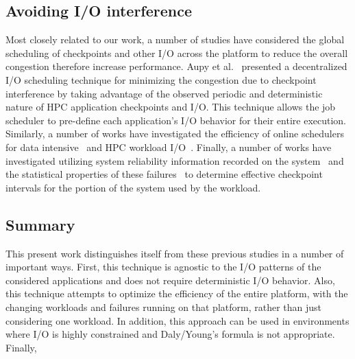  \subsection{Avoiding I/O interference}

Most closely related to our work, a number of studies have considered the
global scheduling of checkpoints and other I/O across the platform to reduce
the overall congestion therefore increase performance.  Aupy et
al.~\cite{Aupy:2017:Periodic} presented a decentralized I/O scheduling
technique for minimizing the congestion due to checkpoint interference by
taking advantage of the observed periodic and deterministic nature of HPC
application checkpoints and I/O.  This technique allows the job scheduler to
pre-define each application’s I/O behavior for their entire execution.
Similarly, a number of works have investigated the efficiency of online
schedulers for data intensive~\cite{Groot2013,Sim:2015:AnalyzeThis} and HPC
workload
I/O~\cite{Dorier2014,Gainaru:2015:Scheduling,Zhou:2015:IOAware,Herbein2016}.
Finally, a number of works have investigated utilizing system reliability
information recorded on the system~\cite{Oliner:2006:Cooperative} and the
statistical properties of these failures~\cite{Tiwari:2014:Lazy} to determine
effective checkpoint intervals for the portion of the system used by the
workload.

\subsection{Summary}

This present work distinguishes itself from these previous studies in a number
of important ways.  First, this technique is agnostic to the I/O patterns of
the considered applications and does not require deterministic I/O behavior.
Also, this technique attempts to optimize the efficiency of the entire
platform, with the changing workloads and failures running on that platform,
rather than just considering one workload. In addition, this approach can be
used in environments where I/O is highly constrained and Daly/Young's formula
is not appropriate.  Finally, 
